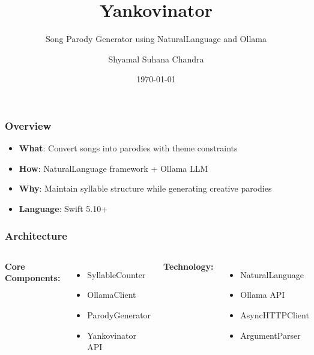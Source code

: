 \documentclass[aspectratio=169]{beamer}
\title{Yankovinator}
\subtitle{Song Parody Generator using NaturalLanguage and Ollama}
\author{Shyamal Suhana Chandra}
\institute{Copyright \textcopyright{} 2025}
\date{\today}
\begin{document}
\frame{\titlepage}

\begin{frame}
\frametitle{Overview}
\begin{itemize}
    \item \textbf{What}: Convert songs into parodies with theme constraints
    \item \textbf{How}: NaturalLanguage framework + Ollama LLM
    \item \textbf{Why}: Maintain syllable structure while generating creative parodies
    \item \textbf{Language}: Swift 5.10+
\end{itemize}
\end{frame}

\begin{frame}
\frametitle{Architecture}
\begin{columns}
\textbf{Core Components:}
\begin{itemize}
    \item SyllableCounter
    \item OllamaClient
    \item ParodyGenerator
    \item Yankovinator API
\end{itemize}

\textbf{Technology:}
\begin{itemize}
    \item NaturalLanguage
    \item Ollama API
    \item AsyncHTTPClient
    \item ArgumentParser
\end{itemize}
\end{columns}
\end{frame}
\end{document}
